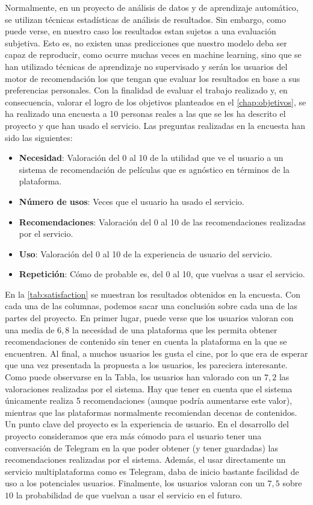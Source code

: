 Normalmente, en un proyecto de análisis de datos y de aprendizaje automático, se utilizan técnicas estadísticas de análisis de resultados. Sin embargo, como puede verse, en nuestro caso los resultados estan sujetos a una evaluación subjetiva. Esto es, no existen unas predicciones que nuestro modelo deba ser capaz de reproducir, como ocurre muchas veces en machine learning, sino que se han utilizado técnicas de aprendizaje no supervisado y serán los usuarios del motor de recomendación los que tengan que evaluar los resultados en base a sus preferencias personales. Con la finalidad de evaluar el trabajo realizado y, en consecuencia, valorar el logro de los objetivos planteados en el \autoref{chap:objetivos}, se ha realizado una encuesta a 10 personas reales a las que se les ha descrito el proyecto y que han usado el servicio. Las preguntas realizadas en la encuesta han sido las siguientes:

\begin{itemize}
    \item \textbf{Necesidad}: Valoración del 0 al 10 de la utilidad que ve el usuario a un sistema de recomendación de películas que es agnóstico en términos de la plataforma.
    \item \textbf{Número de usos}: Veces que el usuario ha usado el servicio.
    \item \textbf{Recomendaciones}: Valoración del 0 al 10 de las recomendaciones realizadas por el servicio.
    \item \textbf{Uso}: Valoración del 0 al 10 de la experiencia de usuario del servicio.
    \item \textbf{Repetición}: Cómo de probable es, del 0 al 10, que vuelvas a usar el servicio.
\end{itemize}

En la \autoref{tab:satisfaction} se muestran los resultados obtenidos en la encuesta. Con cada una de las columnas, podemos sacar una conclusión sobre cada una de las partes del proyecto. En primer lugar, puede verse que los usuarios valoran con una media de $6,8$ la necesidad de una plataforma que les permita obtener recomendaciones de contenido sin tener en cuenta la plataforma en la que se encuentren. Al final, a muchos usuarios les gusta el cine, por lo que era de esperar que una vez presentada la propuesta a los usuarios, les pareciera interesante. Como puede observarse en la Tabla, los usuarios han valorado con un $7,2$ las valoraciones realizadas por el sistema. Hay que tener en cuenta que el sistema únicamente realiza 5 recomendaciones (aunque podría aumentarse este valor), mientras que las plataformas normalmente recomiendan decenas de contenidos. Un punto clave del proyecto es la experiencia de usuario. En el desarrollo del proyecto consideramos que era más cómodo para el usuario tener una conversación de Telegram en la que poder obtener (y tener guardadas) las recomendaciones realizadas por el sistema. Además, el usar directamente un servicio multiplataforma como es Telegram, daba de inicio bastante facilidad de uso a los potenciales usuarios. Finalmente, los usuarios valoran con un $7,5$ sobre $10$ la probabilidad de que vuelvan a usar el servicio en el futuro.

